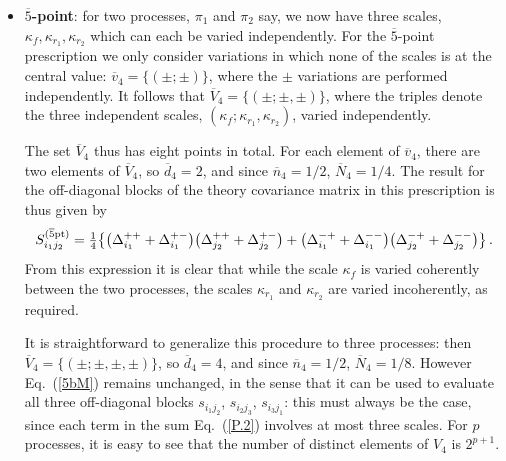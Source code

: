 
\begin{itemize}

\item \textbf{$\overline{5}$-point}: for two processes, $\pi_1$ and 
$\pi_2$ say, we now have 
three scales, $\kappa_f, \kappa_{r_1}, \kappa_{r_2}$ which can each be varied
independently.
%
For the $\overline{5}$-point prescription we only consider variations in
which none of the scales is at the central value: $\overline{v}_4 =
\{(\pm;\pm)\}$,  where 
the $\pm$ variations are performed independently.
%
It follows that  
$\overline{V}_4 = \{(\pm;\pm,\pm)\}$, where the triples denote the
three independent scales, $(\kappa_f; \kappa_{r_1},\kappa_{r_2})$, varied
independently.

The set $\overline{V}_4$ thus has eight points in total.
%
For each element of $\overline{v}_4$, there are two elements of
$\overline{V}_4$, so $\overline{d}_4=2$, and since
$\overline{n}_4=1/2$, $\overline{N}_4=1/4$.
%
The result for the
off-diagonal blocks of the theory covariance matrix in this prescription is thus
given by
\begin{equation}
  \label{5bM}
    S^{(\rm \overline{5}pt)}_{i_1j_2} = \hbox{${{1}\over {4}}$}\big\{ \big(\Delta_{i_1}^{++} + \Delta_{i_1}^{+-}\big) \big(\Delta_{j_2}^{++} + \Delta_{j_2}^{+-} \big) 
    + \big(\Delta_{i_1}^{-+} + \Delta_{i_1}^{--}\big) \big(\Delta_{j_2}^{-+} + \Delta_{j_2}^{--} \big) \big\} \, .
\end{equation}
From this expression it is clear that while the scale $\kappa_f$ is
varied coherently between the two processes, the scales $\kappa_{r_1}$ and
$\kappa_{r_2}$ are varied incoherently, as required. 

It is straightforward to generalize this procedure to three processes:
then $\overline{V}_4 = \{(\pm;\pm,\pm,\pm)\}$, so $\overline{d}_4=4$,
and since $\overline{n}_4=1/2$, $\overline{N}_4=1/8$.  However
Eq.~(\ref{5bM}) remains unchanged, in the sense that it can be used to
evaluate all three off-diagonal blocks $s_{i_1j_2}$, $s_{i_2j_3}$,
$s_{i_3j_1}$: this must always be the case, since each term in the sum
Eq.~(\ref{P.2}) involves at most three scales.
%
For $p$ processes, it is
easy to see that the number of distinct elements of $V_4$ is
$2^{p+1}$. 


\end{itemize}
